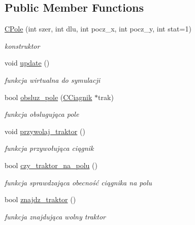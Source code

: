 \subsection*{Public Member Functions}
\begin{DoxyCompactItemize}
\item 
\mbox{\hyperlink{class_c_pole_a34ef39ce57a6af1443cfffbaf19f2436}{C\+Pole}} (int szer, int dlu, int pocz\+\_\+x, int pocz\+\_\+y, int stat=1)
\begin{DoxyCompactList}\small\item\em konstruktor \end{DoxyCompactList}\item 
void \mbox{\hyperlink{class_c_pole_a29afebef6f17a729f4b4aabaad1dc41d}{update}} ()
\begin{DoxyCompactList}\small\item\em funkcja wirtualna do symulacji \end{DoxyCompactList}\item 
\mbox{\label{class_c_pole_a90243c7195b6847fbd46efb90f2424c0}} 
bool \mbox{\hyperlink{class_c_pole_a90243c7195b6847fbd46efb90f2424c0}{obsluz\+\_\+pole}} (\mbox{\hyperlink{class_c_ciagnik}{C\+Ciagnik}} $\ast$trak)
\begin{DoxyCompactList}\small\item\em funkcja obslugująca pole \end{DoxyCompactList}\item 
void \mbox{\hyperlink{class_c_pole_ad55d0b7e22aa43541acfa150ffbaa655}{przywolaj\+\_\+traktor}} ()
\begin{DoxyCompactList}\small\item\em funkcja przywołująca ciągnik \end{DoxyCompactList}\item 
bool \mbox{\hyperlink{class_c_pole_a2b82af53c3497611b96f05c4dc717e0a}{czy\+\_\+traktor\+\_\+na\+\_\+polu}} ()
\begin{DoxyCompactList}\small\item\em funkcja sprawdzająca obecność ciągnika na polu \end{DoxyCompactList}\item 
bool \mbox{\hyperlink{class_c_pole_a2272e326d39402016cf59132a5af78cf}{znajdz\+\_\+traktor}} ()
\begin{DoxyCompactList}\small\item\em funkcja znajdująca wolny traktor \end{DoxyCompactList}\item 

\end{DoxyCompactItemize}
